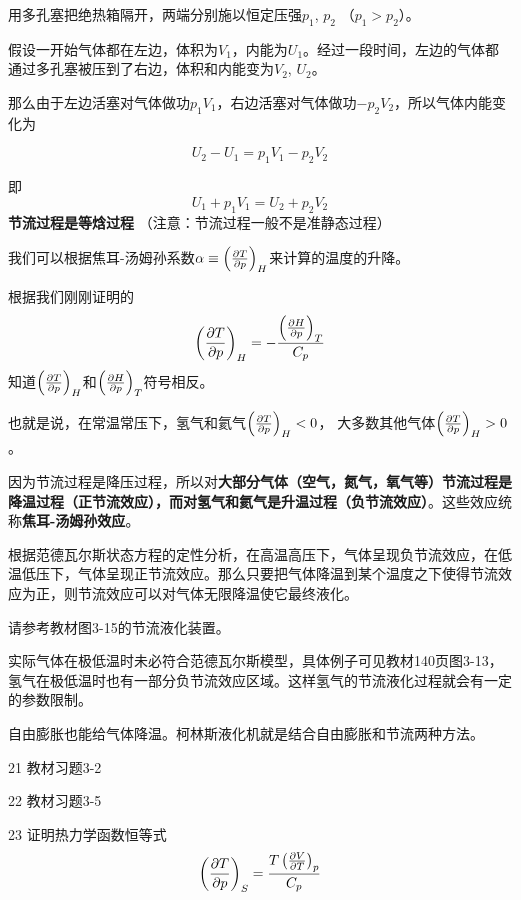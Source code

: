 \documentclass[CJK]{beamer}
\begin{document}
\begin{frame}
\bch

\emini
{}
用多孔塞把绝热箱隔开，两端分别施以恒定压强$p_1$, $p_2$ （$p_1>p_2$）。
\emini

{\small

假设一开始气体都在左边，体积为$V_1$，内能为$U_1$。经过一段时间，左边的气体都通过多孔塞被压到了右边，体积和内能变为$V_2$, $U_2$。

那么由于左边活塞对气体做功$p_1V_1$，右边活塞对气体做功$-p_2V_2$，所以气体内能变化为

$$U_2 - U_1  = p_1V_1 - p_2V_2$$

即
$$ U_1 + p_1V_1 = U_2 + p_2V_2 $$
{\blue \bf 节流过程是等焓过程} （注意：节流过程一般不是准静态过程）

}
\ech
\end{frame}



\begin{frame}
\bch
{\small
我们可以根据焦耳-汤姆孙系数$\alpha \equiv \left(\frac{\partial T}{\partial p}\right)_{H}$来计算的温度的升降。

根据我们刚刚证明的
$$\left(\frac{\partial T}{\partial p}\right)_{H} = - \frac{\left(\frac{\partial H}{\partial p}\right)_{T}}{C_p}$$
知道$\left(\frac{\partial T}{\partial p}\right)_{H}$和$\left(\frac{\partial H}{\partial p}\right)_{T}$符号相反。

也就是说，在常温常压下，氢气和氦气$\left(\frac{\partial T}{\partial p}\right)_{H} < 0$， 大多数其他气体$\left(\frac{\partial T}{\partial p}\right)_{H} > 0$。

因为节流过程是降压过程，所以对{\bf 大部分气体（空气，氮气，氧气等）节流过程是降温过程（正节流效应），而对氢气和氦气是升温过程（负节流效应）}。这些效应统称{\bf 焦耳-汤姆孙效应}。
}
\ech
\end{frame}


\begin{frame}
\bch
{\small
根据范德瓦尔斯状态方程的定性分析，在高温高压下，气体呈现负节流效应，在低温低压下，气体呈现正节流效应。那么只要把气体降温到某个温度之下使得节流效应为正，则节流效应可以对气体无限降温使它最终液化。

\skiplines

请参考教材图3-15的节流液化装置。

\skiplines

\bitem
\item{实际气体在极低温时未必符合范德瓦尔斯模型，具体例子可见教材140页图3-13，氢气在极低温时也有一部分负节流效应区域。这样氢气的节流液化过程就会有一定的参数限制。}
\item{自由膨胀也能给气体降温。柯林斯液化机就是结合自由膨胀和节流两种方法。}
\eitem

}
\ech
\end{frame}



\begin{frame}
\bch
{\small 
\bitem
\item[21]{教材习题3-2}
\item[22]{教材习题3-5}
\item[23]{证明热力学函数恒等式
 $$ \left(\frac{\partial T}{\partial p}\right)_{S} = \frac{T\left(\frac{\partial V}{\partial T}\right)_{p}}{C_p} $$}
\eitem
}
\ech
\end{frame}
\end{document}
